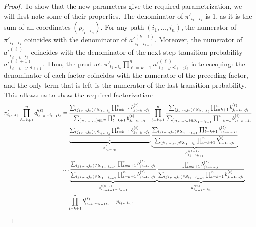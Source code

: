 \documentclass[11pt, a4paper]{article}
\numberwithin{equation}{section}
\theoremstyle{plain}
\theoremstyle{definition}
\begin{document}
\begin{proof}
To show that the new parameters give the required parametrization, we will first note some of their properties. The denominator of $\pi'_{i_1\ldots i_k}$ is 1, as it is the sum of all coordinates $(p_{i_1\ldots i_n})$. For any path $(i_1, \ldots, i_n)$, the numerator of $\pi'_{i_1\ldots i_k}$ coincides with the denominator of $a'^{(k+1)}_{i_1\ldots i_{k+1}}$.
Moreover, the numerator of $a'^{(\ell)}_{i_{\ell-k}\cdots i_{\ell}}$ coincides with the denominator of the next step transition probability $a'^{(\ell+1)}_{i_{\ell-k+1}\cdots i_{\ell+1}}$. Thus, the product
$\textstyle{\pi'_{i_1\ldots i_k} \prod_{\ell=k+1}^n a'^{(\ell)}_{i_{\ell-k}\cdots i_{\ell-1} i_{\ell}}}$ is telescoping: the denominator of each factor coincides with the numerator of the preceding factor, and the only term that is left is the numerator of the last transition probability. This allows us to show the required factorization:
\[\begin{split} \pi'_{i_1\ldots i_k} \prod_{\ell=k+1}^n a'^{(\ell)}_{i_{\ell-k}\cdots i_{\ell-1} i_{\ell}}&=
\frac{\sum_{(j_1, \ldots, j_n)\in S_{i_1\ldots i_k}}\prod_{t=k+1}^n b^{(t)}_{j_{t-k}\ldots j_t}}{\sum_{(j_1,\ldots, j_n) \in S^n} \prod_{t=k+1}^n b^{(t)}_{j_{t-k}\ldots j_t}}\prod_{\ell=k+1}^n \frac{\sum_{(j_1, \ldots, j_n)\in S_{i_1\ldots i_{\ell}}} 
\prod_{t = k+1}^n b^{(t)}_{j_{t-k}\ldots  j_t}}{\sum_{(j_1, \ldots, j_n)\in S_{i_1\ldots i_{\ell-1}}} 
\prod_{t = k+1}^n b^{(t)}_{j_{t-k}\ldots  j_t}} \\
&=\underbrace{\frac{\sum_{(j_1, \ldots, j_n)\in S_{i_1\ldots i_k}}\prod_{t=k+1}^n b^{(t)}_{j_{t-k}\ldots j_t}}{1}}_{\pi'_{i_1\ldots i_k}}
\underbrace{\frac{\sum_{(j_1, \ldots, j_n)\in S_{i_1\ldots i_{k+1}}} 
\prod_{t = k+1}^n b^{(t)}_{j_{t-k}\ldots  j_t}}{\sum_{(j_1, \ldots, j_n)\in S_{i_1\ldots i_{k}}}\prod_{t = k+1}^n b^{(t)}_{j_{t-k}\ldots  j_t}}}_{a'^{(k+1)}_{i_{1}\cdots i_{k+1}}}\\
&\ldots \underbrace{\frac{\sum_{(j_1,\ldots,j_n)\in S_{i_1\ldots i_{n-1}}} 
\prod_{t = k+1}^n b^{(t)}_{j_{t-k}\ldots  j_t}}{\sum_{(j_1, \ldots, j_n)\in S_{i_1\ldots i_{n-2}}} 
\prod_{t = k+1}^n b^{(t)}_{j_{t-k}\ldots  j_t}}}_{a'^{(n-1)}_{i_{n-k-1}\cdots i_{n-1}}}  
\underbrace{\frac{\prod_{t = k+1}^n b^{(t)}_{j_{t-k}\ldots  j_t}}{\sum_{(j_1,\ldots,j_n)\in S_{i_1\ldots i_{n-1}}} 
\prod_{t = k-1}^n b^{(t)}_{j_{t-k}\ldots  j_t}}}_{a'^{(n)}_{i_{n-k}\cdots i_{n}}}  \\
&=\prod_{t=k+1}^n b^{(t)}_{i_{t-k}\cdots i_{t-1} i_{t}}=p_{i_1\ldots i_n} .\qedhere
\end{split}
\]

\end{proof}
\end{document}
